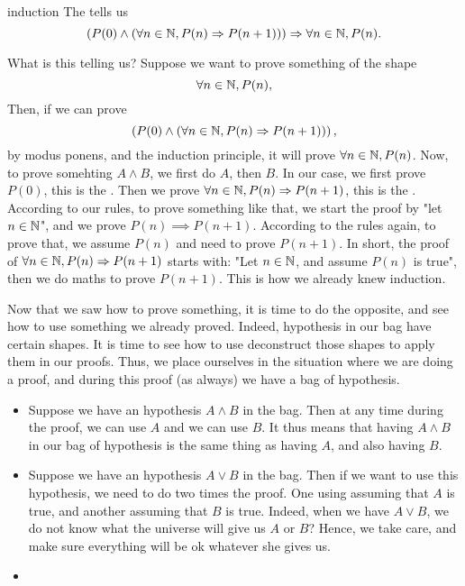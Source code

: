 \begin{cdef}{}{induction}
    The  tells us
    \begin{equation*}
        \left(P(0) \land (\forall n \in \mathbb{N}, P(n) \Rightarrow P(n+1)) \right) \Rightarrow \forall n \in \mathbb{N}, P(n).
    \end{equation*} 
\end{cdef}
What is this telling us? Suppose we want to prove something of the shape
\begin{equation*}
    \forall n \in \mathbb{N}, P(n),
\end{equation*}
Then, if we can prove 
\begin{equation*}
    \left(P(0) \land (\forall n \in \mathbb{N}, P(n) \Rightarrow P(n+1)) \right),
\end{equation*}
by modus ponens, and the induction principle, it will prove \( \forall n \in \mathbb{N}, P(n) \). Now, to prove somehting \( A \land B \), we first do \( A \), then \( B \). In our case, we first prove \( P(0) \), this is the . Then we prove \( \forall n \in \mathbb{N}, P(n) \Rightarrow P(n+1) \), this is the . According to our rules, to prove something like that, we start the proof by "let \( n \in \mathbb{N} \)", and we prove \( P(n) \implies P(n+1) \). According to the rules again, to prove that, we assume \( P(n) \) and need to prove \( P(n + 1) \). In short, the proof of \( \forall n \in \mathbb{N}, P(n) \Rightarrow P(n+1) \) starts with:
"Let \( n \in \mathbb{N} \), and assume \( P(n) \) is true", then we do maths to prove \( P(n+1) \). This is how we already knew induction.

Now that we saw how to prove something, it is time to do the opposite, and see how to use something we already proved. Indeed, hypothesis in our bag have certain shapes. It is time to see how to use deconstruct those shapes to apply them in our proofs. Thus, we place ourselves in the situation where we are doing a proof, and during this proof (as always) we have a bag of hypothesis.
\begin{itemize}
    \item Suppose we have an hypothesis \( A \land B \) in the bag. Then at any time during the proof, we can use \( A \) and we can use \( B \). It thus means that having \( A \land B \) in our bag of hypothesis is the same thing as having \( A \), and also having \( B \). 
    \item Suppose we have an hypothesis \( A \lor B \) in the bag. Then if we want to use this hypothesis, we need to do two times the proof. One using assuming that \( A \) is true, and another assuming that \( B \) is true. Indeed, when we have \( A \lor B \), we do not know what the universe will give us \( A \) or \( B \)? Hence, we take care, and make sure everything will be ok whatever she gives us.
    \item 
\end{itemize}


